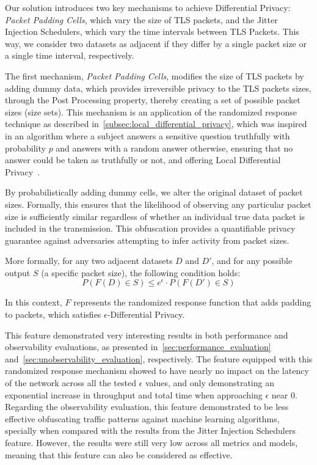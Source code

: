 Our solution introduces two key mechanisms to achieve Differential Privacy: \textit{Packet Padding Cells}, which vary the size of TLS packets, and the Jitter Injection Schedulers, which vary the time intervals between TLS Packets. This way, we consider two datasets as adjacent if they differ by a single packet size or a single time interval, respectively.

The first mechanism, \textit{Packet Padding Cells}, modifies the size of TLS packets by adding dummy data, which provides irreversible privacy to the TLS packets sizes, through the Post Processing property, thereby creating a set of possible packet sizes (size sets).
This mechanism is an application of the randomized response technique as described in~\cref{subsec:local_differential_privacy}, which was inspired in an algorithm where a subject answers a sensitive question truthfully with probability $p$ and answers with a random answer otherwise, ensuring that no answer could be taken as truthfully or not, and offering Local Differential Privacy~\cite{RandomizedResponse, AlgFoundationsDP}.

By probabilistically adding dummy cells, we alter the original dataset of packet sizes. Formally, this ensures that the likelihood of observing any particular packet size is sufficiently similar regardless of whether an individual true data packet is included in the transmission. This obfuscation provides a quantifiable privacy guarantee against adversaries attempting to infer activity from packet sizes.

More formally, for any two adjacent datasets $D$ and $D'$, and for any possible output $S$ (a specific packet size), the following condition holds:
\[P(F(D) \in S) \leq e^{\epsilon} \cdot P(F(D') \in S)\]

In this context, $F$ represents the randomized response function that adds padding to packets, which satisfies $\epsilon$-Differential Privacy. 

This feature demonstrated very interesting results in both performance and observability evaluations, as presented in~\cref{sec:performance_evaluation} and~\cref{sec:unobservability_evaluation}, respectively. The feature equipped with this randomized response mechanism showed to have nearly no impact on the latency of the network across all the tested $\epsilon$ values, and only demonstrating an exponential increase in throughput and total time when approaching $\epsilon$ near 0. Regarding the observability evaluation, this feature demonstrated to be less effective obfuscating traffic patterns against machine learning algorithms, specially when compared with the results from the Jitter Injection Schedulers feature. However, the results were still very low across all metrics and models, meaning that this feature can also be considered as effective.

